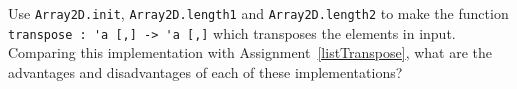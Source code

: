 Use \lstinline{Array2D.init}, \lstinline{Array2D.length1} and \lstinline{Array2D.length2} to make the function \lstinline{transpose : 'a [,] -> 'a [,]} which transposes the elements in input. Comparing this implementation with Assignment~\ref{listTranspose}, what are the advantages and disadvantages of each of these implementations?
